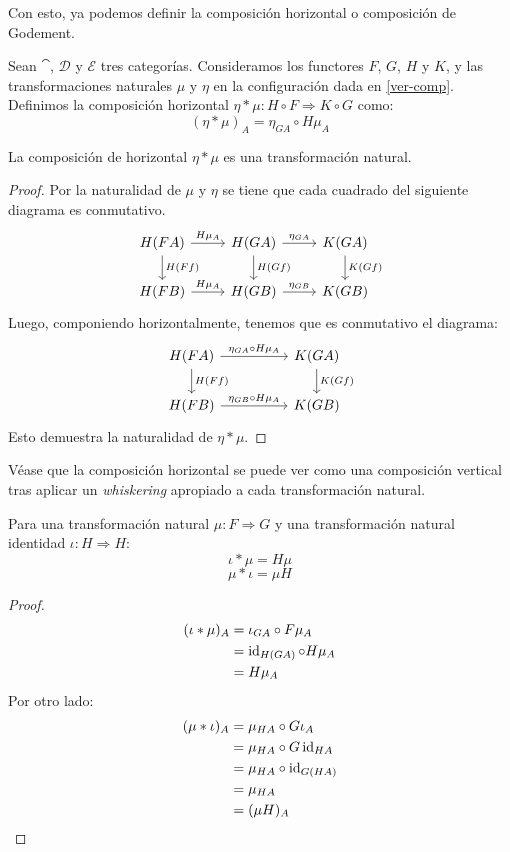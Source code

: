 Con esto, ya podemos definir la composición horizontal o composición de Godement.
\begin{definition}
Sean $\cat$, $\mathcal{D}$ y $\mathcal{E}$ tres categorías.
Consideramos los functores $F$, $G$, $H$ y $K$, y las transformaciones naturales $\mu$ y $\eta$ en la configuración dada en \ref{ver-comp}.
Definimos la composición horizontal $\eta * \mu \colon H \circ F \Rightarrow K \circ G$ como:
\[ (\eta * \mu)_A = \eta_{G A} \circ H\mu_A \]
\end{definition}
\begin{proposition}
La composición de horizontal $\eta * \mu$ es una transformación natural.
\end{proposition}
\begin{proof}
Por la naturalidad de $\mu$ y $\eta$ se tiene que cada cuadrado del siguiente diagrama es conmutativo.
\[\begin{tikzcd}
{H(F A)} \arrow[r,"H\mu_A"] \arrow[d,"H(F f)"] & {H(G A)} \arrow[r,"\eta_{G A}"] \arrow[d,"H(G f)"] & {K(G A)} \arrow[d,"K(G f)"]\\
{H(F B)} \arrow[r,"H\mu_A"] & {H(G B)} \arrow[r,"\eta_{G B}"] & {K(G B)}
\end{tikzcd}\]
Luego, componiendo horizontalmente, tenemos que es conmutativo el diagrama:
\[\begin{tikzcd}
{H(F A)} \arrow[rr,"\eta_{G A} \circ H\mu_A"] \arrow[d,"H(F f)"] & & {K(G A)} \arrow[d,"K(G f)"]\\
{H(F B)} \arrow[rr,"\eta_{G B} \circ H\mu_A"] & & {K(G B)}
\end{tikzcd}\]
Esto demuestra la naturalidad de $\eta * \mu$.
\end{proof}

Véase que la composición horizontal se puede ver como una composición vertical tras aplicar un \emph{whiskering} apropiado a cada transformación natural.

\begin{proposition}
Para una transformación natural $\mu \colon F \Rightarrow G$ y una transformación natural identidad $\iota \colon H \Rightarrow H$:
\[ \iota * \mu = H\mu \]
\[ \mu * \iota = \mu H\]
\end{proposition}
\begin{proof}
\begin{align*}
(\iota * \mu)_A & = \iota_{G A} \circ F\mu_A\\
& = \operatorname{id}_{H (G A)} \circ H\mu_A\\
& = H\mu_A
\end{align*}
Por otro lado:
\begin{align*}
(\mu * \iota)_A & = \mu_{H A} \circ G\iota_A\\
& = \mu_{H A} \circ G\operatorname{id}_{H A}\\
& = \mu_{H A} \circ \operatorname{id}_{G(H A)}\\
& = \mu_{H A}\\
& = (\mu H)_A
\end{align*}
\end{proof}

